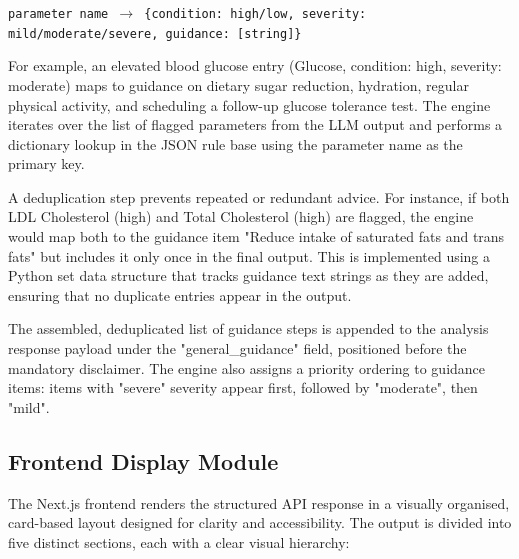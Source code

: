 \documentclass[12pt,a4paper]{report}
\begin{document}
\begin{center}
\texttt{parameter name $\rightarrow$ \{condition: high/low, severity: mild/moderate/severe, guidance: [string]\}}
\end{center}

For example, an elevated blood glucose entry (Glucose, condition: high, severity: moderate) maps to guidance on dietary sugar reduction, hydration, regular physical activity, and scheduling a follow-up glucose tolerance test. The engine iterates over the list of flagged parameters from the LLM output and performs a dictionary lookup in the JSON rule base using the parameter name as the primary key.

A deduplication step prevents repeated or redundant advice. For instance, if both LDL Cholesterol (high) and Total Cholesterol (high) are flagged, the engine would map both to the guidance item "Reduce intake of saturated fats and trans fats" but includes it only once in the final output. This is implemented using a Python set data structure that tracks guidance text strings as they are added, ensuring that no duplicate entries appear in the output.

The assembled, deduplicated list of guidance steps is appended to the analysis response payload under the "general\_guidance" field, positioned before the mandatory disclaimer. The engine also assigns a priority ordering to guidance items: items with "severe" severity appear first, followed by "moderate", then "mild".

\subsection{Frontend Display Module}
The Next.js frontend renders the structured API response in a visually organised, card-based layout designed for clarity and accessibility. The output is divided into five distinct sections, each with a clear visual hierarchy:
\end{document}
